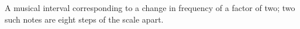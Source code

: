 A musical interval corresponding to a change in frequency 
of a factor of two; two such notes are eight steps of
the scale apart.